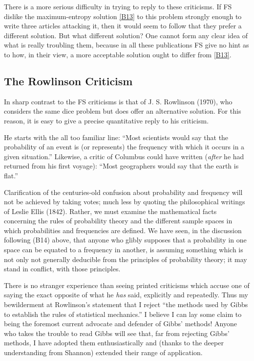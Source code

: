 There is a more serious difficulty in trying to reply to these criticisms.
If \cite{friedman}{FS} dislike the maximum-entropy solution \eqref{B13} to this problem strongly enough to write three articles attacking it, then it would seem to follow that they prefer a different solution.
But what different solution?
One cannot form any clear idea of what is really troubling them, because in all these publications \cite{friedman}{FS} give no hint as to how, in their view, a more acceptable solution ought to differ from \eqref{B13}.


\subsection{The Rowlinson Criticism}
In sharp contrast to the \cite{friedman}{FS} criticisms is that of J. S. Rowlinson (\cite{rowlinson}{1970}), who considers the same dice problem but does offer an alternative solution.
For this reason, it is easy to give a precise quantitative reply to his criticism.

He starts with the all too familiar line: ``Most scientists would say that the probability of an event is (or represents) the frequency with which it occurs in a given situation.'' Likewise, a critic of Columbus could have written (\emph{after} he had returned from his first voyage): ``Most geographers would say that the earth is flat.''

Clarification of the centuries-old confusion about probability and frequency will not be achieved by taking votes; much less by quoting the philosophical writings of Leslie Ellis (\cite{ellis}{1842}).
Rather, we must examine the mathematical facts concerning the rules of probability theory and the different sample spaces in which probabilities and frequencies are defined.
We have seen, in the discussion following (B14) above, that anyone who glibly supposes that a probability in one space can be equated to a frequency in another, is assuming something which is not only not generally deducible from the principles of probability theory; it may stand in conflict, with those principles.

There is no stranger experience than seeing printed criticisms which accuse one of saying the exact opposite of what he \emph{has} said, explicitly and repeatedly.
Thus my bewilderment at Rowlinson's statement that I reject ``the methods used by Gibbs to establish the rules of statistical mechanics.''
I believe I can lay some claim to being the foremost current advocate and defender of Gibbs’ methods!
Anyone who takes the trouble to read Gibbs will see that, far from rejecting Gibbs' methods, I have adopted them enthusiastically and (thanks to the deeper understanding from Shannon) extended their range of application.

